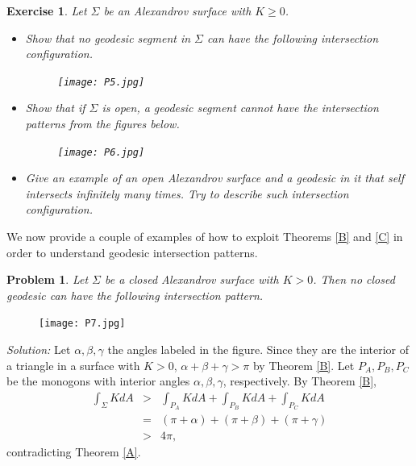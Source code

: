 \documentclass[oneside,a4paper]{amsart}
\newtheorem{exer}[thm]{Exercise}
\newtheorem{prob}[thm]{Problem}
\begin{document}
\begin{exer}
Let $\Sigma$ be an Alexandrov surface with $K \geq 0$. 
\begin{itemize}
\item Show that no geodesic segment in $\Sigma $ can have the following intersection configuration.

\begin{figure}[h]
\begin{center}
\texttt{[image: P5.jpg]}\\
\end{center}
\end{figure}

\item Show that if $\Sigma$ is open, a geodesic segment cannot have the intersection patterns from the figures below.

\begin{figure}[h]
\begin{center}
\texttt{[image: P6.jpg]}\\
\end{center}
\end{figure}

\item Give an example of an open Alexandrov surface and a geodesic in it that self intersects infinitely many times. Try to describe such intersection configuration.
\end{itemize}
\end{exer}

We now provide a couple of examples of how to exploit Theorems \ref{B} and \ref{C} in order to understand geodesic intersection patterns.

\begin{prob}\label{D}
Let $\Sigma$ be a closed Alexandrov surface with $K > 0$. Then no closed geodesic can have the following intersection pattern.
\end{prob}


\begin{figure}[h]
\begin{center}
\texttt{[image: P7.jpg]}\\
\end{center}
\end{figure}


\textit{Solution:} Let $\alpha, \beta, \gamma$ the angles labeled in the figure. Since they are the interior of a triangle in a surface with $K > 0$, $\alpha + \beta + \gamma > \pi$ by Theorem \ref{B}. Let $P_A, P_B, P_C$ be the monogons with interior angles $\alpha, \beta, \gamma$, respectively. By Theorem \ref{B},
\begin{eqnarray}
\int_{\Sigma }K dA & > & \int_{P_A}K dA + \int_{P_B}K dA + \int_{P_C}K dA \\
& = & (\pi + \alpha ) + (\pi + \beta ) + (\pi + \gamma )\\
& > & 4 \pi ,
\end{eqnarray}
contradicting Theorem \ref{A}.
\end{document}
